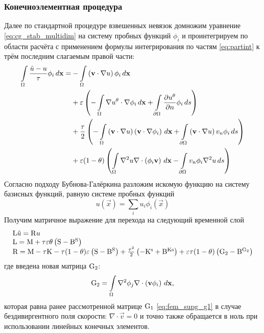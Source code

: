 \subsubsection{Конечноэлементная процедура}
Далее по стандартной процедуре взвешенных невязок
домножим уравнение \cref{eq:cg_stab_multidim} на систему пробных функций $\phi_i$
и проинтегрируем по области расчёта
с применением формулы интегрирования по частям \cref{eq:partint} к трём последним слагаемым правой части:
\begin{equation*}
\begin{split}
\int\limits_{\Omega}\frac{\hat u - u}{\tau}\phi_i \, d \boldsymbol{\rm x} = &
-\int\limits_{\Omega}\left(\boldsymbol{\rm v} \cdot \nabla u \right)\phi_i \, d \boldsymbol{\rm x} \\
&
+\varepsilon\left(
	-\int\limits_{\Omega}\nabla u^\theta \cdot \nabla \phi_i \, d \boldsymbol{\rm x}
	+ \int\limits_{\partial\Omega}\frac{\partial u^\theta}{\partial n}\phi_i \, d s
\right) \\
&
+\frac{\tau}{2}\left(
	-\int\limits_{\Omega}\left(\boldsymbol{\rm v} \cdot \nabla u\right)\left(\boldsymbol{\rm v}\cdot\nabla\phi_i\right) \, d \boldsymbol{\rm x}
	+\int\limits_{\partial\Omega}\left(\boldsymbol{\rm v} \cdot \nabla u\right) v_n \phi_i \, d s
\right)\\
&
+\varepsilon(1-\theta)\left(
\int\limits_{\Omega}\nabla^2 u \nabla\cdot\left(\phi_i \boldsymbol{\rm v}\right) \, d \boldsymbol{\rm x}
-\int\limits_{\partial\Omega}v_n \phi_i\nabla^2 u \, d s
\right)
\end{split}
\end{equation*}
Согласно подходу Бубнова-Галёркина
разложим искомую функцию на систему базисных
функций, равную системе пробных функций
$$
u(\vec x) = \sum_i u_i \phi_i(\vec x)
$$
Получим матричное выражение для перехода на следующий временной слой
\begin{equation}
\begin{array}{l}
{\rm L} \hat u = {\rm R} u \\
{\rm L} = {\rm M} + \tau\varepsilon\theta\left({\rm S} - {\rm B^S}\right) \\
{\rm R} = {\rm M} - \tau {\rm K} - \tau(1 - \theta)\varepsilon\left({\rm S} - {\rm B^S}\right)
+ \frac{\tau^2}{2}\left(-{\rm K^s} + {\rm B^{Ks}}\right)
+ \varepsilon\tau(1 - \theta)\left({\rm G}_2 - {\rm B^{G_2}}\right)
\end{array}
\end{equation}
где введена новая матрица ${\rm G}_2$:
\begin{equation*}
{\rm G}_2 = \int\limits_{\Omega}\nabla^2 \phi_j \nabla\cdot\left(\boldsymbol{\rm v} \phi_i\right) \, d \boldsymbol{\rm x},
\end{equation*}
которая равна ранее рассмотренной матрице ${\rm G}_1$ \cref{eq:fem_supg_g1}
в случае бездивиргентного поля скорости: $\nabla\cdot \vec v = 0$
и точно также обращается в ноль при использовании линейных конечных элементов.

